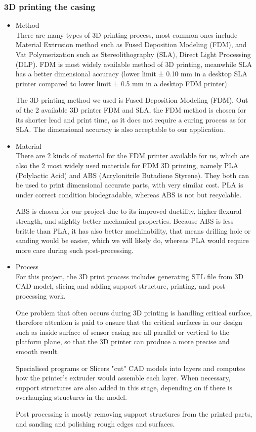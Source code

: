 \subsubsection{3D printing the casing}
\begin{itemize}
    \item Method\\ 
    There are many types of 3D printing process, most common ones include Material Extrusion method such as Fused Deposition Modeling (FDM), and Vat Polymerization such as Stereolithography (SLA), Direct Light Processing (DLP). FDM is most widely available method of 3D printing, meanwhile SLA has a better dimensional accuracy (lower limit ± 0.10 mm in a desktop SLA printer compared to lower limit ± 0.5 mm in a desktop FDM printer).

    The 3D printing method we used is Fused Deposition Modeling (FDM). Out of the 2 available 3D printer FDM and SLA, the FDM method is chosen for its shorter lead and print time, as it does not require a curing process as for SLA. The dimensional accuracy is also acceptable to our application.
    
    

    \item Material\\ 
    There are 2 kinds of material for the FDM printer available for us, which are also the 2 most widely used materials for FDM 3D printing, namely PLA (Polylactic Acid) and ABS (Acrylonitrile Butadiene Styrene). They both can be used to print dimensional accurate parts, with very similar cost. PLA is under correct condition biodegradable, whereas ABS is not but recyclable.

    ABS is chosen for our project due to its improved ductility, higher flexural strength, and slightly better mechanical properties. Because ABS is less brittle than PLA, it has also better machinability, that means drilling hole or sanding would be easier, which we will likely do, whereas PLA would require more care during such post-processing.

    \item Process\\ 
    For this project, the 3D print process includes generating STL file from 3D CAD model, slicing and adding support structure, printing, and post processing work.

    One problem that often occurs during 3D printing is handling critical surface, therefore attention is paid to ensure that the critical surfaces in our design such as inside surface of sensor casing are all parallel or vertical to the platform plane, so that the 3D printer can produce a more precise and smooth result.

    Specialised programs or Slicers "cut" CAD models into layers and computes how the printer's extruder would assemble each layer. When necessary, support structures are also added in this stage, depending on if there is overhanging structures in the model.

    Post processing is mostly removing support structures from the printed parts, and sanding and polishing rough edges and surfaces.
\end{itemize}

\FloatBarrier
\vspace{1cm}

